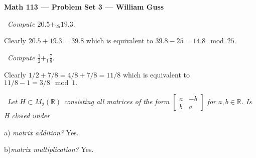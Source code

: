 \documentclass[11pt]{amsart}
\def\reals{{\mathbb R}}
\begin{document}
\begin{center}{\bf Math 113 --- Problem Set 3 --- William Guss} \end{center}


\bigskip


\medskip {}\ \emph{Compute $20.5 +_{25} 19.3$}. 

Clearly $20.5+19.3 = 39.8$ which is equivalent to $39.8 -25  = 14.8 \mod 25$.


\medskip {}\ \emph{Compute $\frac{1}{2} +_1 \frac{7}{8}.$}

Clearly $1/2 + 7/8 = 4/8 + 7/8 = 11/8$ which is equivalent to $11/8 -1 = 3/8 \mod 1.$




\medskip {}\ \emph{Let $H \subset M_2 (\reals)$ consisting all matrices of the form \(\begin{bmatrix}
	a & -b \\
	b & a
\end{bmatrix}\) for $a,b \in \reals$. Is H closed under}


a) \emph{matrix addition?} Yes.


b)\emph{matrix multiplication?} Yes.
\end{document}
